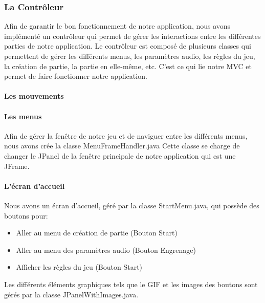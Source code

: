 \subsubsection{La Contrôleur}
\label{subsubsec:controleur}

Afin de garantir le bon fonctionnement de notre application, nous avons implémenté un contrôleur qui permet de gérer les interactions entre les différentes parties de notre application. Le contrôleur est composé de plusieurs classes qui permettent de gérer les différents menus, les paramètres audio, les règles du jeu, la création de partie, la partie en elle-même, etc. C'est ce qui lie notre MVC et permet de faire fonctionner notre application.

\paragraph{Les mouvements}


\paragraph{Les menus}

Afin de gérer la fenêtre de notre jeu et de naviguer entre les différents menus, nous avons crée la classe MenuFrameHandler.java Cette classe se charge de changer le JPanel de la fenêtre principale de notre application qui est une JFrame.

\paragraph{L'écran d'accueil}

Nous avons un écran d'accueil, géré par la classe StartMenu.java, qui possède des boutons pour:

\begin{itemize}
    \item Aller au menu de création de partie (Bouton Start)
    \item Aller au menu des paramètres audio (Bouton Engrenage)
    \item Afficher les règles du jeu (Bouton Start)
\end{itemize}

Les différents éléments graphiques tels que le GIF et les images des boutons sont gérés par la classe JPanelWithImages.java.


